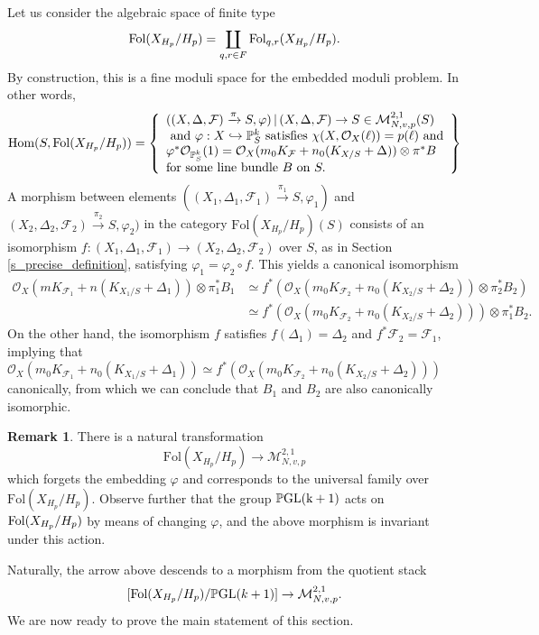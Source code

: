 \documentclass[12pt, a4paper]{amsart}
\newcommand\PP{\mathbb{P}}
\newcommand\OO{\mathcal{O}}
\newcommand\FF{\mathcal{F}}
\newcommand\Fol{\text{Fol}}
\newcommand\Hom{\text{Hom}}
\theoremstyle{definition}
\newtheorem{remark}[theorem]{Remark}
\theoremstyle{named}
\begin{document}
Let us consider the algebraic space of finite type
$$ {\rm Fol}(X_{H_p}/{H_p})=\coprod_{q,r\in F} {\rm Fol}_{q,r}(X_{H_p}/H_p). $$
By construction, this is a fine moduli space for the embedded moduli problem.
In other words, 
$$ \Hom (S,{\rm Fol}(X_{H_p}/H_p)) = \left\{  \begin{array}{l}
    ((X,\Delta, \FF)\xrightarrow[]{\pi} S , \varphi) \, | \, (X, \Delta, \FF)\to S \in\mathcal M^{2,1}_{N, v,p}(S)  \\
  \mbox{ and }  \varphi: X\hookrightarrow\PP^k_S \mbox{ satisfies } \chi(X,\OO_X(\ell))=p(\ell) \mbox{ and} \\ 
  \varphi^*\OO_{\PP^k_S}(1)=\OO_X(m_0 K_\FF + n_0 (K_{X/S}+\Delta))\otimes \pi^*B  \\
  \mbox{for some line bundle } B \mbox{ on } S. 
  \end{array}\right\}
 $$
A morphism between elements $((X_1,\Delta_1, \FF_1)\xrightarrow[]{\pi_1} S , \varphi_1)$ and $(X_2,\Delta_2, \FF_2)\xrightarrow[]{\pi_2} S , \varphi_2)$ in the category $\Fol(X_{H_p}/H_p)(S)$ consists of an isomorphism $f:(X_1,\Delta_1, \FF_1)\to (X_2,\Delta_2, \FF_2)$ over $S$, as in Section \ref{s_precise_definition}, satisfying $\varphi_1=\varphi_2\circ f$. This yields a canonical isomorphism 
\begin{align*}
    \OO_X(m K_{\FF_1} + n (K_{X_1/S}+\Delta_1))\otimes \pi_1^*B_1&\simeq f^*(\OO_X(m_0 K_{\FF_2} + n_0 (K_{X_2/S}+\Delta_2))\otimes \pi_2^*B_2)\\
&\simeq f^*(\OO_X(m_0 K_{\FF_2} + n_0 (K_{X_2/S}+\Delta_2)))\otimes \pi_1^*B_2.
\end{align*}
On the other hand, the isomorphism $f$ satisfies $f(\Delta_1)=\Delta_2$ and $f^*\FF_2=\FF_1$, implying that $\OO_X(m_0 K_{\FF_1} + n_0 (K_{X_1/S}+\Delta_1))\simeq f^*(\OO_X(m_0 K_{\FF_2} + n_0 (K_{X_2/S}+\Delta_2)))$ canonically, from which we can conclude that $B_1$ and $B_2$ are also canonically isomorphic.

\begin{remark} \label{rmk_univfamily}
There is a natural transformation
$$\Fol(X_{H_p}/H_p)\to \mathcal{M}^{2,1}_{N, v,p}$$
which forgets the embedding $\varphi$ and corresponds to the universal family over $\Fol(X_{H_p}/H_p)$.
    Observe further that the group $\PP \rm GL({k+1})$ acts on ${\rm Fol}(X_{H_p}/H_p)$ by means of changing $\varphi$, and the above morphism is invariant under this action.
\end{remark}

Naturally, the arrow above descends to a morphism from the quotient stack $$[{\rm Fol}(X_{H_p}/H_p)/{\rm \PP GL}(k+1)]\to \mathcal{M}^{2,1}_{N, v,p}.$$ 
We are now ready to prove the main statement of this section.
 
\end{document}
